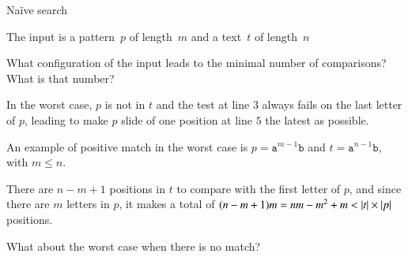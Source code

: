 %
\begin{frame}{Naïve search}

The input is a pattern~\(p\) of length~\(m\) and a text~\(t\) of
length~\(n\)

\bigskip

What configuration of the input leads to the minimal number of
comparisons? What is that number?

\bigskip

In the worst case, \(p\) is not in \(t\) and the test at line \(3\)
always fails on the last letter of \(p\), leading to make \(p\)
slide of one position at line \(5\) the latest as possible.

\bigskip

An example of positive match in the worst case is \(p =
\texttt{a}^{m-1}\texttt{b}\) and \(t = \texttt{a}^{n-1}\texttt{b}\),
with \(m \leq n\).

\bigskip

There are \(n - m + 1\) positions in \(t\) to compare with the first
letter of \(p\), and since there are \(m\) letters in \(p\), it makes
a total of \((n - m + 1) m = nm - m^2 + m < \left\lvert\smash{t}\right\rvert \times \left\lvert\smash{p}\right\rvert\)
positions.

\bigskip

What about the worst case when there is no match?

\end{frame}
